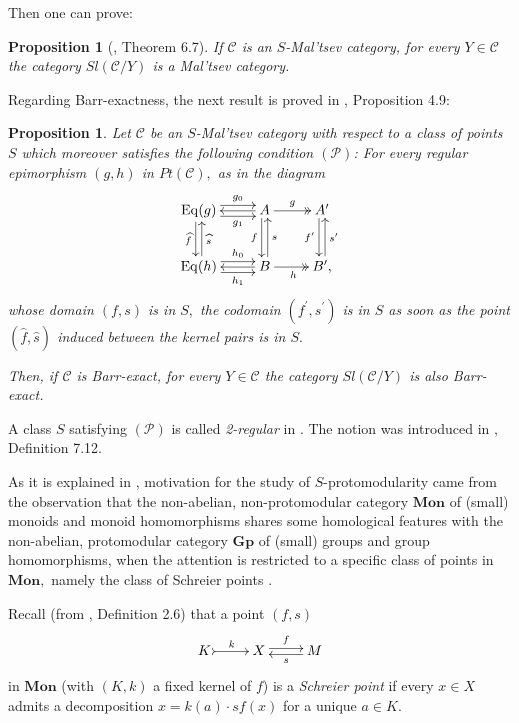 \documentclass[11pt]{amsart}
\theoremstyle{plain}
\newtheorem{proposition}[subsubsection]{Proposition}
\theoremstyle{definition}
\theoremstyle{remark}
\begin{document}
Then one can prove:
\begin{proposition}[\cite{partial}, Theorem 6.7]
\label{prop:S-special-Maltsev}
If $\mathcal{C}$ is an $S$-Mal'tsev category, for every $Y\in\mathcal{C}$ the category $Sl(\mathcal{C}/Y)$ is a Mal'tsev category.
\end{proposition}
Regarding Barr-exactness, the next result is proved in \cite{3x3}, Proposition 4.9:
\begin{proposition}
\label{prop:special_exact}
Let $\mathcal{C}$ be an $S$-Mal'tsev category with respect to a class of points $S$ which moreover satisfies the following condition $(\mathscr{P})$: For every regular epimorphism $(g,h)$ in $Pt(\mathcal{C}),$ as in the diagram
\begin{equation}
\begin{aligned}
\label{eqn:2-regular}
\xymatrix{
{\mathrm{Eq}(g)} \ar@<.9ex>[r]^-{g_0} \ar@<-.9ex>[r]_-{g_1} \ar@<-.5ex>[d]_-{\widehat{f}}  &{A} \ar[l] \ar@{->>}[r]^-g \ar@<-.5ex>[d]_-{f} &{A^\prime} \ar@<-.5ex>[d]_-{f^\prime} \\
{\mathrm{Eq}(h)} \ar@<.9ex>[r]^-{h_0} \ar@<-.9ex>[r]_-{h_1} \ar@<-.5ex>[u]_-{\widehat{s}}  &{B} \ar[l] \ar@{->>}[r]_h \ar@<-.5ex>[u]_-s &{B^\prime,} \ar@<-.5ex>[u]_-{s^\prime}
}
\end{aligned}
\end{equation}
whose domain $(f,s)$ is in $S,$ the codomain $(f^\prime,s^\prime)$ is in $S$ as soon as the point $(\widehat{f},\widehat{s})$ induced between the kernel pairs is in $S.$

Then, if $\mathcal{C}$ is Barr-exact, for every $Y\in\mathcal{C}$ the category $Sl(\mathcal{C}/Y)$ is also Barr-exact.
\end{proposition}
A class $S$ satisfying $(\mathscr{P})$ is called \emph{2-regular} in \cite{partial, 3x3}. The notion was introduced in \cite{partial}, Definition 7.12.

As it is explained in \cite{schreier_book, S-protomodular}, motivation for the study of $S$-protomodularity came from the observation that the non-abelian, non-protomodular category $\mathbf{Mon}$ of (small) monoids and monoid homomorphisms shares some homological features with the non-abelian, protomodular category $\mathbf{Gp}$ of (small) groups and group homomorphisms, when the attention is restricted to a specific class of points in $\mathbf{Mon},$ namely the class of Schreier points \cite{MMS13, schreier_book}.

Recall (from \cite{MMS13}, Definition 2.6) that a point $(f,s)$
\begin{equation}
\label{eqn:schreier_point}
\xymatrix{K \ar@{>->}[r]^-k &X \ar@<.5ex>[r]^-f &M \ar@<.5ex>[l]^-s }
\end{equation}
in $\mathbf{Mon}$ (with $(K,k)$ a fixed kernel of $f$) is a \emph{Schreier point} if every $x\in X$ admits a decomposition $x=k(a)\cdot sf(x)$ for a unique $a\in K.$
\end{document}
